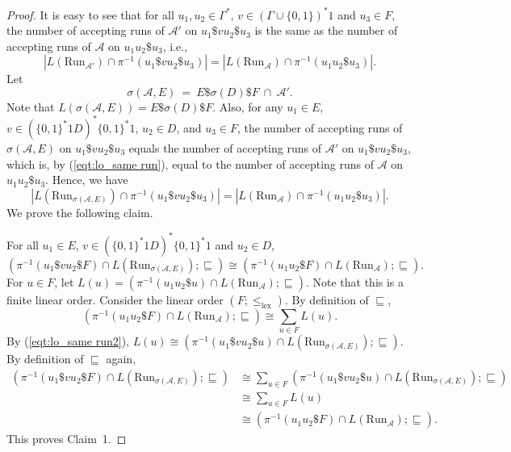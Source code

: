 \documentclass[envcountsame]{llncs}
\newcommand{\A}{\mathcal A}
\newcommand{\lex}{\mathrm{lex}}
\newcommand{\Run}{\mathrm{Run}}
\begin{document}
\begin{proof}
It is easy to see that for all $u_1,u_2\in \Gamma^*$, 
$v\in (\Gamma\cup\{0,1\})^* 1$ and 
$u_3\in F$, the number of accepting runs of $\A'$ on 
$u_1\$ v u_2 \$ u_3$ is the same as the number of accepting runs of $\A$ on $u_1 u_2 \$ u_3$, i.e.,
\begin{equation}\label{eqt:lo_same run}
    |L(\Run_{\A'}) \cap \pi^{-1}(u_1\$v u_2 \$ u_3) |  
      = |L(\Run_{\A}) \cap \pi^{-1}(u_1 u_2\$ u_3)|.
\end{equation}
Let 
\[
\sigma(\A,E) \ = \ E\$ \sigma(D) \$ F \ \cap \ \A'.\]
Note that $L(\sigma(\A,E))=E\$ \sigma(D) \$ F$. Also, for any $u_1\in E$, 
$v\in (\{0,1\}^* 1 D)^* \{0,1\}^* 1$, $u_2\in D$, and $u_3\in F$, the number of accepting runs of 
$\sigma(\A,E)$ on $u_1\$ vu_2\$ u_3$ equals the number of accepting runs of $\A'$ on 
$u_1\$ v u_2 \$ u_3$, which is, by (\ref{eqt:lo_same run}), equal to the number of accepting runs of $\A$ on $u_1 u_2\$ u_3$.
Hence, we have
\begin{equation}\label{eqt:lo_same run2}
    |L(\Run_{\sigma(\A,E)}) \cap \pi^{-1}(u_1\$vu_2 \$ u_3) |  
        = |L(\Run_{\A})\cap \pi^{-1}(u_1 u_2\$ u_3)|.
\end{equation}
We prove the following claim.

\medskip

  For all $u_1\in E$, $v\in (\{0,1\}^* 1 D)^*\{0,1\}^*1$ and $u_2\in D$, 
\begin{equation}\label{eqt:lo_shuf}
    (\pi^{-1}(u_1\$ v u_2 \$ F)\cap L(\Run_{\sigma(\A,E)}) ; \sqsubseteq) \cong (\pi^{-1}(u_1 u_2 \$ F)\cap L(\Run_\A) ; \sqsubseteq).
\end{equation}
For $u\in F$, let $L(u)=(\pi^{-1}(u_1 u_2 \$ u)\cap L(\Run_\A); \sqsubseteq)$. 
Note that this is a finite linear order.
Consider the linear order $(F;\leq_{\lex})$.
By definition of $\sqsubseteq$,
\[
    (\pi^{-1}(u_1 u_2 \$ F)\cap L(\Run_\A) ; \sqsubseteq) \cong  \sum_{u\in F} L(u).
\]
By (\ref{eqt:lo_same run2}), $L(u)\cong  (\pi^{-1}(u_1\$ v u_2 \$ u)\cap L(\Run_{\sigma(\A,E)}) ; \sqsubseteq)$. By definition of $\sqsubseteq$ again,
\begin{align*}
    (\pi^{-1}(u_1\$ v u_2 \$ F)\cap L(\Run_{\sigma(\A,E)}) ; \sqsubseteq)  
   & \cong \sum_{u\in F} (\pi^{-1}(u_1\$ v u_2 \$ u)\cap L(\Run_{\sigma(\A,E)}) ; \sqsubseteq) \\ 
   &\cong  \sum_{u\in F} L(u) \\ 
   &\cong (\pi^{-1}(u_1 u_2 \$ F)\cap L(\Run_\A) ; \sqsubseteq) .
\end{align*}
This proves Claim~1.


\end{proof}
\end{document}
